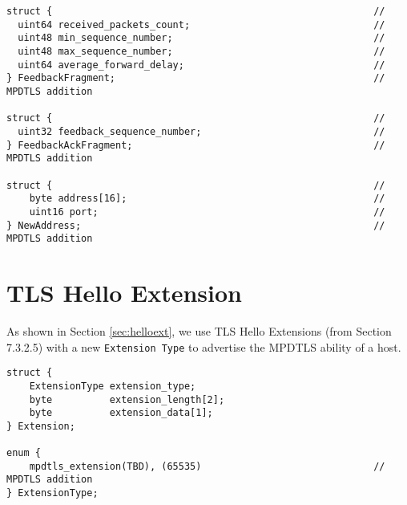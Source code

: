 \begin{lstlisting}
struct {                                                        //
  uint64 received_packets_count;                                //
  uint48 min_sequence_number;                                   //
  uint48 max_sequence_number;                                   //
  uint64 average_forward_delay;                                 //
} FeedbackFragment;                                             // MPDTLS addition

struct {                                                        //
  uint32 feedback_sequence_number;                              //
} FeedbackAckFragment;                                          // MPDTLS addition

struct {                                                        //
    byte address[16];                                           //
    uint16 port;                                                //
} NewAddress;                                                   // MPDTLS addition
\end{lstlisting}

\section{TLS Hello Extension}

As shown in Section \ref{sec:helloext}, we use TLS Hello Extensions \cite{draft-tls13}(from Section 7.3.2.5) with a new \texttt{Extension Type} to advertise the MPDTLS ability of a host.

\begin{lstlisting} 
struct {
    ExtensionType extension_type;
    byte          extension_length[2];
    byte          extension_data[1];
} Extension;

enum {
    mpdtls_extension(TBD), (65535)                              // MPDTLS addition
} ExtensionType;
\end{lstlisting}
